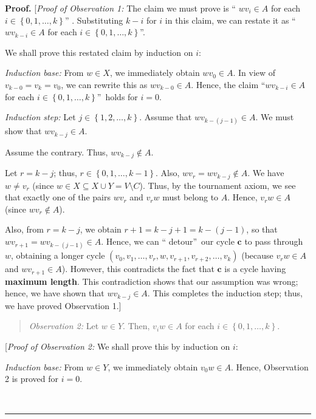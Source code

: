 \documentclass[numbers=enddot,12pt,final,onecolumn,notitlepage]{scrartcl}%
\numberwithin{exer}{subsection}
\theoremstyle{definition}
\newenvironment{statement}{\begin{quote}}{\end{quote}}
\newenvironment{proof}[1][Proof]{\noindent\textbf{#1.} }{\ \rule{0.5em}{0.5em}}
\begin{document}
\begin{proof}
[\textit{Proof of Observation 1:} The claim we must prove is \textquotedblleft%
$wv_{i}\in A$ for each $i\in\left\{  0,1,\ldots,k\right\}  $\textquotedblright%
. Substituting $k-i$ for $i$ in this claim, we can restate it as
\textquotedblleft$wv_{k-i}\in A$ for each $i\in\left\{  0,1,\ldots,k\right\}
$\textquotedblright.

We shall prove this restated claim by induction on $i$:

\textit{Induction base:} From $w\in X$, we immediately obtain $wv_{0}\in A$.
In view of $v_{k-0}=v_{k}=v_{0}$, we can rewrite this as $wv_{k-0}\in A$.
Hence, the claim \textquotedblleft$wv_{k-i}\in A$ for each $i\in\left\{
0,1,\ldots,k\right\}  $\textquotedblright\ holds for $i=0$.

\textit{Induction step:} Let $j\in\left\{  1,2,\ldots,k\right\}  $. Assume
that $wv_{k-\left(  j-1\right)  }\in A$. We must show that $wv_{k-j}\in A$.

Assume the contrary. Thus, $wv_{k-j}\notin A$.

Let $r=k-j$; thus, $r\in\left\{  0,1,\ldots,k-1\right\}  $. Also,
$wv_{r}=wv_{k-j}\notin A$. We have $w\neq v_{r}$ (since $w\in X\subseteq X\cup
Y=V\setminus C$). Thus, by the tournament axiom, we see that exactly one of
the pairs $wv_{r}$ and $v_{r}w$ must belong to $A$. Hence, $v_{r}w\in A$
(since $wv_{r}\notin A$).

Also, from $r=k-j$, we obtain $r+1=k-j+1=k-\left(  j-1\right)  $, so that
$wv_{r+1}=wv_{k-\left(  j-1\right)  }\in A$. Hence, we can \textquotedblleft
detour\textquotedblright\ our cycle $\mathbf{c}$ to pass through $w$,
obtaining a longer cycle $\left(  v_{0},v_{1},\ldots,v_{r},w,v_{r+1}%
,v_{r+2},\ldots,v_{k}\right)  $ (because $v_{r}w\in A$ and $wv_{r+1}\in A$).
However, this contradicts the fact that $\mathbf{c}$ is a cycle having
\textbf{maximum length}. This contradiction shows that our assumption was
wrong; hence, we have shown that $wv_{k-j}\in A$. This completes the induction
step; thus, we have proved Observation 1.]

\begin{statement}
\textit{Observation 2:} Let $w\in Y$. Then, $v_{i}w\in A$ for each
$i\in\left\{  0,1,\ldots,k\right\}  $.
\end{statement}

[\textit{Proof of Observation 2:} We shall prove this by induction on $i$:

\textit{Induction base:} From $w\in Y$, we immediately obtain $v_{0}w\in A$.
Hence, Observation 2 is proved for $i=0$.


\end{proof}
\end{document}
